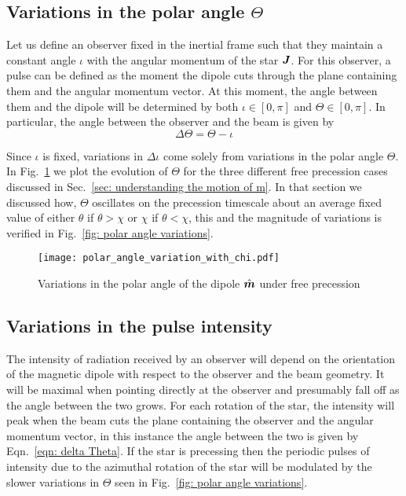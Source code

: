\documentclass[../full_thesis/full_thesis.tex]{subfiles}
\begin{document}
\subsection{Variations in the polar angle $\Theta$}
Let us define an observer fixed in the inertial frame such that they
maintain a constant angle $\iota$ with the angular momentum of the star $\boldsymbol{J}$.
For this observer, a pulse can be defined as the moment the dipole cuts through
the plane containing them and the angular momentum vector. At this moment, the
angle between them and the dipole will be determined by both $\iota \in [0, \pi]$ and
$\Theta \in [0, \pi]$. In particular, the angle between the observer and the beam
is given by
\begin{equation}
\Delta\Theta = \Theta - \iota
\label{eqn: delta Theta}
\end{equation}

Since $\iota$ is fixed, variations in $\Delta\iota$ come solely from variations
in the polar angle $\Theta$. In Fig.~\ref{fig: polar angle variations} we plot
the evolution of $\Theta$ for the three different free precession cases
discussed in Sec.~\ref{sec: understanding the motion of m}. In that section we
discussed how, $\Theta$ oscillates on the precession timescale about an average
fixed value of either $\theta$ if $\theta > \chi$ or $\chi$ if $\theta < \chi$,
this and the magnitude of variations is verified in Fig.~\ref{fig: polar angle
variations}.
\begin{figure}[ht]
\centering
  \texttt{[image: polar\_angle\_variation\_with\_chi.pdf]}
\caption{Variations in the polar angle of the dipole $\hat{\boldsymbol{m}}$ under free precession}
\label{fig: polar angle variations}
\end{figure}

\subsection{Variations in the pulse intensity}
The intensity of radiation received by an observer will depend on the
orientation of the magnetic dipole with respect to the observer and the beam
geometry. It will be maximal when pointing directly at the observer and
presumably fall off as the angle between the two grows. For each rotation of
the star, the intensity will peak when the beam cuts the plane containing the
observer and the angular momentum vector, in this instance the angle between
the two is given by Eqn.~\eqref{eqn: delta Theta}. If the star is precessing
then the periodic pulses of intensity due to the azimuthal rotation of the star
will be modulated by the slower variations in $\Theta$ seen in Fig.~\ref{fig:
polar angle variations}.
\end{document}

